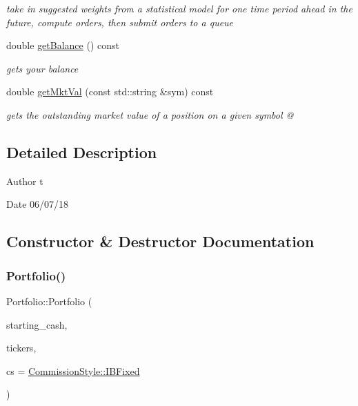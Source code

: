 \begin{DoxyCompactItemize}
\begin{DoxyCompactList}\small\item\em take in suggested weights from a statistical model for one time period ahead in the future, compute orders, then submit orders to a queue \end{DoxyCompactList}\item 
double \hyperlink{classPortfolio_aba2f09887f0859f9407cb961c10f0fef}{get\+Balance} () const
\begin{DoxyCompactList}\small\item\em gets your balance \end{DoxyCompactList}\item 
double \hyperlink{classPortfolio_aca678d7a74e62ea9fa30843685585b48}{get\+Mkt\+Val} (const std\+::string \&sym) const
\begin{DoxyCompactList}\small\item\em gets the outstanding market value of a position on a given symbol @ \end{DoxyCompactList}\end{DoxyCompactItemize}


\subsection{Detailed Description}
\begin{DoxyAuthor}{Author}
t 
\end{DoxyAuthor}
\begin{DoxyDate}{Date}
06/07/18 
\end{DoxyDate}


\subsection{Constructor \& Destructor Documentation}
\mbox{\label{classPortfolio_a24c03991b952db0c6c81210466b9a3ef}} 
\subsubsection{\texorpdfstring{Portfolio()}{Portfolio()}}
{\footnotesize\ttfamily Portfolio\+::\+Portfolio (\begin{DoxyParamCaption}\item[{double}]{starting\+\_\+cash,  }\item[{std\+::vector$<$ std\+::string $>$}]{tickers,  }\item[{\hyperlink{pnl__calculator_8h_ad733a3c57302a7ac3408d55dc65f2681}{Commission\+Style}}]{cs = {\ttfamily \hyperlink{pnl__calculator_8h_ad733a3c57302a7ac3408d55dc65f2681a4c7c9e42a09b0674cdd86bbbd41b42f3}{Commission\+Style\+::\+I\+B\+Fixed}} }\end{DoxyParamCaption})}



